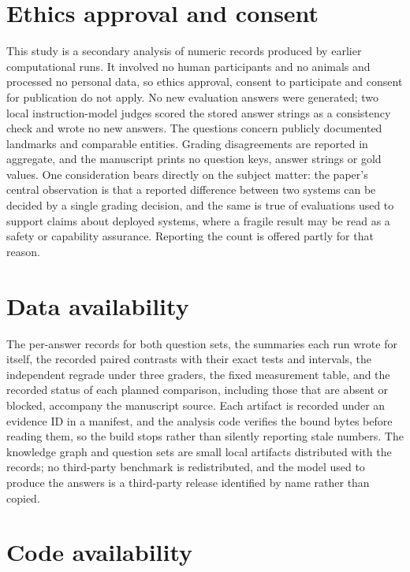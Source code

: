 \section*{Ethics approval and consent}

This study is a secondary analysis of numeric records produced by earlier
computational runs. It involved no human participants and no animals and
processed no personal data, so ethics approval, consent to participate and
consent for publication do not apply. No new evaluation answers were generated;
two local instruction-model judges scored the stored answer strings as a
consistency check and wrote no new answers. The questions concern publicly
documented landmarks and comparable entities. Grading disagreements are
reported in aggregate, and the manuscript prints no question keys, answer
strings or gold values. One consideration bears directly on the subject matter:
the paper's central observation is that a reported difference between two
systems can be decided by a single grading decision, and the same is true of
evaluations used to support claims about deployed systems, where a fragile
result may be read as a safety or capability assurance. Reporting the count is
offered partly for that reason.

\section*{Data availability}

The per-answer records for both question sets, the summaries each run wrote for
itself, the recorded paired contrasts with their exact tests and intervals, the
independent regrade under three graders, the fixed measurement table, and the
recorded status of each planned comparison, including those that are absent or
blocked, accompany the manuscript source. Each artifact is recorded under an
evidence ID in a manifest, and the analysis code verifies the bound bytes
before reading them, so the build stops rather than silently reporting stale
numbers. The knowledge graph and question sets are small local artifacts
distributed with the records; no third-party benchmark is redistributed, and
the model used to produce the answers is a third-party release identified by
name rather than copied.


\section*{Code availability}


